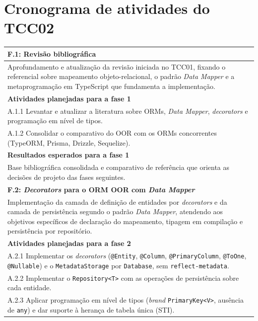 \newpage
\section{Cronograma de atividades do TCC02}
\label{sc:cronograma}

\begin{longtable}{p{\textwidth}}
\label{tab:fases}\\
\toprule%
\myrowcolour%
\bfseries F.1: Revisão bibliográfica \\
\midrule
Aprofundamento e atualização da revisão iniciada no TCC01, fixando o referencial sobre mapeamento objeto-relacional, o padrão \emph{Data Mapper} e a metaprogramação em TypeScript que fundamenta a implementação.
\\
\midrule
\myrowcolour%
\bfseries Atividades planejadas para a fase 1 \\
\midrule
A.1.1 Levantar e atualizar a literatura sobre ORMs, \emph{Data Mapper}, \emph{decorators} e programação em nível de tipos. \\
A.1.2 Consolidar o comparativo do OOR com os ORMs concorrentes (TypeORM, Prisma, Drizzle, Sequelize). \\
\midrule
\myrowcolour%
\bfseries Resultados esperados para a fase 1 \\
\midrule
Base bibliográfica consolidada e comparativo de referência que orienta as decisões de projeto das fases seguintes. \\
\toprule%
\myrowcolour%
\bfseries F.2: \emph{Decorators} para o ORM OOR com \emph{Data Mapper} \\
\midrule
Implementação da camada de definição de entidades por \emph{decorators} e da camada de persistência segundo o padrão \emph{Data Mapper}, atendendo aos objetivos específicos de declaração do mapeamento, tipagem em compilação e persistência por repositório.
\\
\midrule
\myrowcolour%
\bfseries Atividades planejadas para a fase 2 \\
\midrule
A.2.1 Implementar os \emph{decorators} (\texttt{@Entity}, \texttt{@Column}, \texttt{@PrimaryColumn}, \texttt{@ToOne}, \texttt{@Nullable}) e o \texttt{MetadataStorage} por \texttt{Database}, sem \texttt{reflect-metadata}. \\
A.2.2 Implementar o \texttt{Repository<T>} com as operações de persistência sobre cada entidade. \\
A.2.3 Aplicar programação em nível de tipos (\emph{brand} \texttt{PrimaryKey<V>}, ausência de \texttt{any}) e dar suporte à herança de tabela única (STI). \\

\end{longtable}
